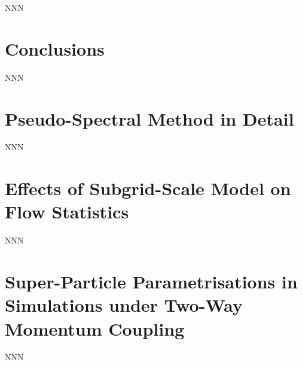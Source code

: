 \documentclass{pracamgren}
\begin{document}
NNN



\chapter*{Conclusions}
\label{ch:end}

NNN


\appendix
\chapter{Pseudo-Spectral Method in Detail}
\label{app:psm}

NNN



\chapter{Effects of Subgrid-Scale Model on Flow Statistics}
\label{app:sgs}

NNN


\chapter{Super-Particle Parametrisations in Simulations under Two-Way Momentum Coupling}
\label{app:spp}

NNN


\printbibliography[title=References]
\end{document}
